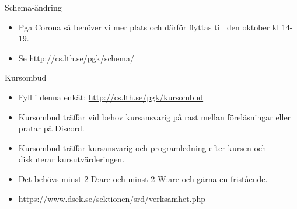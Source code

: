 
\ifkompendium\else
\begin{SlideExtra}{Schema-ändring}
  \begin{itemize}
    \item Pga Corona så behöver vi mer plats och därför flyttas  till den  oktober kl 14-19.
    \item Se \url{http://cs.lth.se/pgk/schema/}
  \end{itemize}
\end{SlideExtra}
  
\begin{SlideExtra}{Kursombud}
\begin{itemize}
\item Fyll i denna enkät: \url{http://cs.lth.se/pgk/kursombud}
\item Kursombud träffar vid behov kursansvarig på rast mellan föreläsningar eller pratar på Discord.
\item Kursombud träffar kursansvarig och programledning efter kursen och diskuterar kursutvärderingen.
\item Det behövs minst 2 D:are och minst 2 W:are och gärna en fristående.
\item {\SlideFontSmall\url{https://www.dsek.se/sektionen/srd/verksamhet.php}}
\end{itemize}
\end{SlideExtra}
\fi
